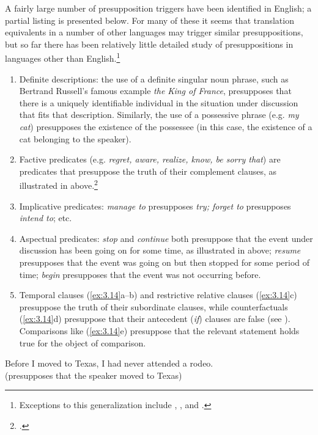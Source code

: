 A fairly large number of presupposition triggers have been identified in English; a partial listing is presented below. For many of these it seems that translation equivalents in a number of other languages may trigger similar presuppositions, but so far there has been relatively little detailed study of presuppositions in languages other than English.\footnote{Exceptions to this generalization include \citet{LevinsonAnnamalai1992}, \citet{Matthewson2006}, and \citet{TonhauserEtAl2013}.}


\begin{enumerate}[label=\alph*.]
\item Definite descriptions: the use of a definite singular noun phrase, such as Bertrand Russell’s famous example \textit{the King of France}, presupposes that there is a uniquely identifiable individual in the situation under discussion that fits that description. Similarly, the use of a possessive phrase (e.g. \textit{my cat}) presupposes the existence of the possessee (in this case, the existence of a cat belonging to the speaker).
\item Factive predicates (e.g. \textit{regret, aware, realize, know, be sorry that}) are predicates that presuppose the truth of their complement clauses, as illustrated in  above.\footnote{\citet{KiparskyKiparsky1970}.}
\item Implicative predicates: \textit{manage to} presupposes \textit{try; forget to} presupposes \textit{intend to}; etc.
\item Aspectual predicates: \textit{stop} and \textit{continue} both presuppose that the event under discussion has been going on for some time, as illustrated in  above; \textit{resume} presupposes that the event was going on but then stopped for some period of time; \textit{begin} presupposes that the event was not occurring before.
\item Temporal clauses (\ref{ex:3.14}a--b) and restrictive relative clauses (\ref{ex:3.14}c) presuppose the truth of their subordinate clauses, while counterfactuals (\ref{ex:3.14}d) presuppose that their antecedent (\textit{if}) clauses are false (see ). Comparisons like (\ref{ex:3.14}e) presuppose that the relevant statement holds true for the object of comparison.
\end{enumerate}

\ea \label{ex:3.14}
\ea Before I moved to Texas, I had never attended a rodeo.\\
  (presupposes that the speaker moved to Texas)

